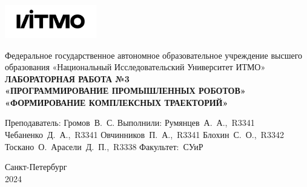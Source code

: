 \documentclass[a4paper, 12pt]{article}
\begin{document}
    \begin{titlepage}

        \begin{center}
        \includegraphics[width=0.3\textwidth]{itmo.png} %
        \vfill
        
        Федеральное государственное автономное образовательное учреждение высшего образования
        «Национальный Исследовательский Университет ИТМО»\\
        
        \vfill
        {\large\bf ЛАБОРАТОРНАЯ РАБОТА №3}\\
        {\large\bf «ПРОГРАММИРОВАНИЕ ПРОМЫШЛЕННЫХ РОБОТОВ»}\\
        {\large\bf «ФОРМИРОВАНИЕ КОМПЛЕКСНЫХ ТРАЕКТОРИЙ»}
        \vfill

        \begin{flushright}
            \begin{minipage}{.45\textwidth}
            {
                \hbox{Преподаватель:}
                \hbox{Громов В. С.}
                \hbox{}
                \hbox{Выполнили:}
                \hbox{Румянцев А. А., R3341}
                \hbox{Чебаненко Д. А., R3341}
                \hbox{Овчинников П. А., R3341}
                \hbox{Блохин С. О., R3342}
                \hbox{Тоскано О. Арасели Д. П., R3338}
                \hbox{}
                \hbox{Факультет: СУиР}
            }
            \end{minipage}
        \end{flushright}
        
        \vfill
                
        Санкт-Петербург\\
        2024
        \end{center}
    \end{titlepage}
    
    \tableofcontents

    \newpage
\end{document}
